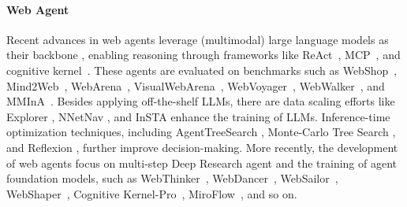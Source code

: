\documentclass[11pt]{article}
\begin{document}
\paragraph{Web Agent}
Recent advances in web agents leverage (multimodal) large language models as their backbone \citep{llama3, leopard, gpt4, claude37}, enabling reasoning through frameworks like ReAct~\cite{yaoreact}, MCP~\citep{MCP}, and cognitive kernel~\citep{cognitive_kernel}. 
These agents are evaluated on benchmarks such as WebShop~\citep{webshop}, Mind2Web~\citep{mind2web}, WebArena~\citep{webarena}, VisualWebArena~\citep{visualwebarena}, WebVoyager~\citep{webvoyager}, WebWalker~\citep{WebWalker}, and MMInA~\citep{MMInA}.
Besides applying off-the-shelf LLMs, there are data scaling efforts like Explorer \citep{Explorer}, NNetNav \citep{NNetNav}, and InSTA \citep{DBLP:journals/corr/abs-2502-06776} enhance the training of LLMs. 
Inference-time optimization techniques, including AgentTreeSearch \citep{AgentTreeSearch}, Monte-Carlo Tree Search \citep{AgentQ, Exact, LATS, webpilot}, and Reflexion \citep{Reflexion}, further improve decision-making.
More recently, the development of web agents focus on multi-step Deep Research agent and the training of agent foundation models, such as WebThinker~\cite{li2025webthinker}, WebDancer~\cite{wu2025webdancer}, WebSailor~\cite{li2025websailor}, WebShaper~\cite{tao2025webshaper}, Cognitive Kernel-Pro~\cite{cognitivekernel-pro}, MiroFlow~\cite{MiroFlow2025}, and so on.
\end{document}
